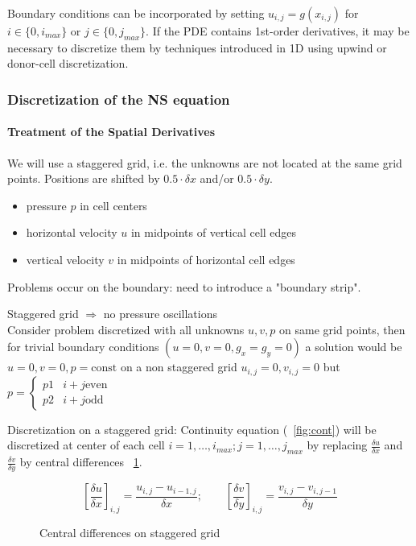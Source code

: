 Boundary conditions can be incorporated by setting $u_{i,j} = g(x_{i,j})$ for $i \in \lbrace 0, i_{max} \rbrace$ or $j \in \lbrace 0,j_{max} \rbrace$. If the PDE contains 1st-order derivatives, it may be necessary to discretize them by techniques introduced in 1D using upwind or donor-cell discretization.

\subsubsection{Discretization of the NS equation}
\paragraph{Treatment of the Spatial Derivatives}
We will use a staggered grid, i.e. the unknowns are not located at the same grid points. Positions are shifted by $0.5 \cdot \delta x$ and/or $0.5 \cdot \delta y$.
\begin{itemize}
	\item pressure $p$ in cell centers
	\item horizontal velocity $u$ in midpoints of vertical cell edges
	\item vertical velocity $v$ in midpoints of horizontal cell edges
\end{itemize}


Problems occur on the boundary: need to introduce a "boundary strip".

Staggered grid $\Rightarrow$ no pressure oscillations\\
Consider problem discretized with all unknowns $u,v,p$ on same grid points, then for trivial boundary conditions $(u = 0, v =0, g_x = g_y = 0)$ a solution would be $u = 0, v = 0, p = \text{const}$ on a non staggered grid $u_{i,j} = 0, v_{i,j} = 0$ but $p = \begin{cases}
p1 & i+j \text{even}\\
p2 & i+j \text{odd}
\end{cases}$

Discretization on a staggered grid: Continuity equation (~\ref{fig:cont}) will be discretized at center of each cell $i = 1, \dots, i_{max}; j = 1, \dots, j_{max}$ by replacing $\frac{\delta u}{\delta x}$ and $\frac{\delta v}{\delta y}$ by central differences ~\ref{fig:dif-cen-stag}.

\begin{figure}[H]
	\centering
	\[ \left[ \frac{\delta u}{\delta x}\right]_{i,j} = \frac{u_{i,j} - u_{i-1,j}}{\delta x}; \qquad  \left[ \frac{\delta v}{\delta y}\right]_{i,j} = \frac{v_{i,j} - v_{i,j-1}}{\delta y} \]
	\renewcommand{\thefigure}{3.16}
	\caption{Central differences on staggered grid}
	\label{fig:dif-cen-stag}
\end{figure}

